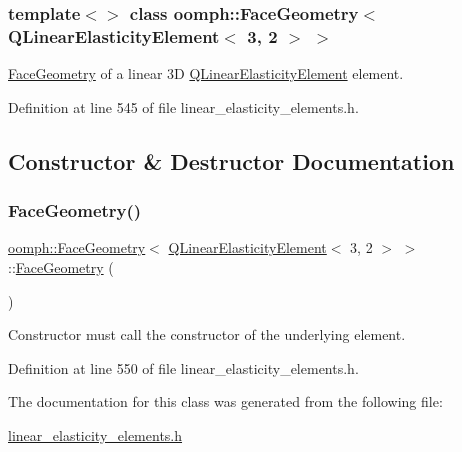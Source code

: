 \subsubsection*{template$<$$>$\newline
class oomph\+::\+Face\+Geometry$<$ Q\+Linear\+Elasticity\+Element$<$ 3, 2 $>$ $>$}

\hyperlink{classoomph_1_1FaceGeometry}{Face\+Geometry} of a linear 3D \hyperlink{classoomph_1_1QLinearElasticityElement}{Q\+Linear\+Elasticity\+Element} element. 

Definition at line 545 of file linear\+\_\+elasticity\+\_\+elements.\+h.



\subsection{Constructor \& Destructor Documentation}
\mbox{\label{classoomph_1_1FaceGeometry_3_01QLinearElasticityElement_3_013_00_012_01_4_01_4_a0b4f8dfe4ce2b194545b195086c55b7b}} 
\subsubsection{\texorpdfstring{Face\+Geometry()}{FaceGeometry()}}
{\footnotesize\ttfamily \hyperlink{classoomph_1_1FaceGeometry}{oomph\+::\+Face\+Geometry}$<$ \hyperlink{classoomph_1_1QLinearElasticityElement}{Q\+Linear\+Elasticity\+Element}$<$ 3, 2 $>$ $>$\+::\hyperlink{classoomph_1_1FaceGeometry}{Face\+Geometry} (\begin{DoxyParamCaption}{ }\end{DoxyParamCaption})\hspace{0.3cm}{\ttfamily [inline]}}



Constructor must call the constructor of the underlying element. 



Definition at line 550 of file linear\+\_\+elasticity\+\_\+elements.\+h.



The documentation for this class was generated from the following file\+:\begin{DoxyCompactItemize}
\item 
\hyperlink{linear__elasticity__elements_8h}{linear\+\_\+elasticity\+\_\+elements.\+h}\end{DoxyCompactItemize}
